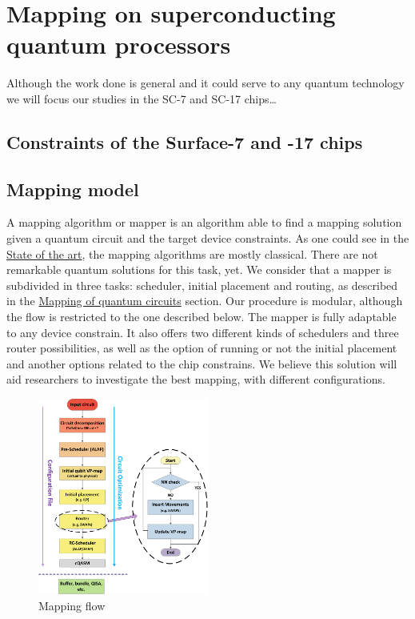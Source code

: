

\chapter{Mapping on superconducting quantum processors}
\label{sec:orgd862e6c}

Although the work done is general and it could serve to any quantum technology we will focus our studies in the SC-7 and SC-17 chips\ldots{}

\section{Constraints of the Surface-7 and -17 chips}
\label{sec:org154e60e}


\section{Mapping model}
\label{sec:org5bc6ab7}
A mapping algorithm or mapper is an algorithm able to find a mapping solution given a quantum circuit and the target device constraints.
As one could see in the \href{chapter-2.org}{State of the art}, the mapping algorithms are mostly classical.
There are not remarkable quantum solutions for this task, yet.
We consider that a mapper is subdivided in three tasks: scheduler, initial placement and routing, as described in the \href{chapter-2.org}{Mapping of quantum circuits} section.
Our procedure is modular, although the flow is restricted to the one described below.
The mapper is fully adaptable to any device constrain.
It also offers two different kinds of schedulers and three router possibilities, as well as the option of running or not the initial placement and another options related to the chip constrains.
We believe this solution will aid researchers to investigate the best mapping, with different configurations.

\begin{figure}[htbp]
\centering
\includegraphics[width=0.5\textwidth]{figures/mapping_flow2.png}
\caption{\label{fig:org832af30}
Mapping flow}
\end{figure}

